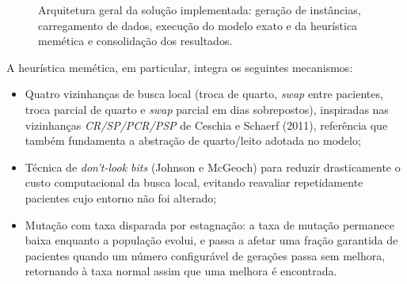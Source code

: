 \documentclass[12pt,a4paper]{article}
\begin{document}
\begin{figure}[h]
\centering
{}
\caption{Arquitetura geral da solução implementada: geração de instâncias,
carregamento de dados, execução do modelo exato e da heurística memética e
consolidação dos resultados.}
\label{fig:arquitetura}
\end{figure}

A heurística memética, em particular, integra os seguintes mecanismos:

\begin{itemize}
    \item Quatro vizinhanças de busca local (troca de quarto, \textit{swap} entre
    pacientes, troca parcial de quarto e \textit{swap} parcial em dias sobrepostos),
    inspiradas nas vizinhanças \textit{CR/SP/PCR/PSP} de Ceschia e Schaerf (2011),
    referência que também fundamenta a abstração de quarto/leito adotada no
    modelo;
    \item Técnica de \textit{don't-look bits} (Johnson e McGeoch) para reduzir
    drasticamente o custo computacional da busca local, evitando reavaliar
    repetidamente pacientes cujo entorno não foi alterado;
    \item Mutação com taxa disparada por estagnação: a taxa de
    mutação permanece baixa enquanto a população evolui, e passa a afetar uma
    fração garantida de pacientes quando um número configurável de gerações passa
    sem melhora, retornando à taxa normal assim que uma melhora é encontrada.
\end{itemize}
\end{document}

